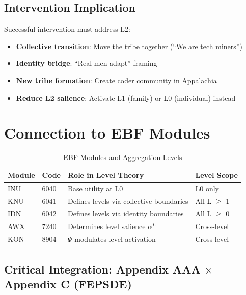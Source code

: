 \subsection{Intervention Implication}

Successful intervention must address L2:
\begin{itemize}
\item \textbf{Collective transition}: Move the tribe together (``We are tech miners'')
\item \textbf{Identity bridge}: ``Real men adapt'' framing
\item \textbf{New tribe formation}: Create coder community in Appalachia
\item \textbf{Reduce L2 salience}: Activate L1 (family) or L0 (individual) instead
\end{itemize}

\section{Connection to EBF Modules}
\label{sec:aaa-bcm-connection}

\begin{table}[htbp]
\centering
\caption{EBF Modules and Aggregation Levels}
\label{tab:aaa-bcm-modules}
\renewcommand{\arraystretch}{1.4}
\begin{tabular}{@{}llll@{}}
\toprule
\textbf{Module} & \textbf{Code} & \textbf{Role in Level Theory} & \textbf{Level Scope} \\
\midrule
INU & 6040 & Base utility at L0 & L0 only \\
KNU & 6041 & Defines levels via collective boundaries & All L $\geq$ 1 \\
IDN & 6042 & Defines levels via identity boundaries & All L $\geq$ 0 \\
AWX & 7240 & Determines level salience $\alpha^L$ & Cross-level \\
KON & 8904 & $\Psi$ modulates level activation & Cross-level \\
\bottomrule
\end{tabular}
\end{table}

\subsection{Critical Integration: Appendix AAA $\times$ Appendix C (FEPSDE)}
\label{subsec:aaa-c-integration}

